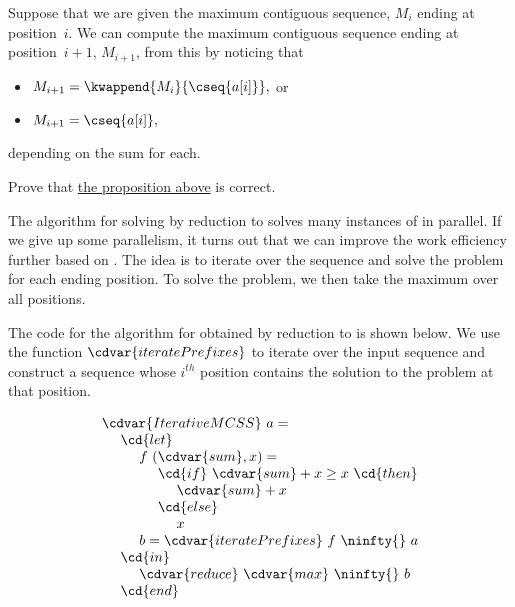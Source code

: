 \begin{proposition}
\label{prop:mcss::reduction::mcsse-overlaps}
Suppose that we are given the maximum contiguous sequence, $M_{i}$
ending at position~$i$.
%
We can compute the maximum contiguous sequence ending at position~$i+1$,
$M_{i+1}$, from this by noticing that 
%
\begin{itemize}
\item $M_{i+1} = \kwappend{M_{i}}{\cseq{a[i]}},$ or 
\item $M_{i+1} = \cseq{a[i]},$
\end{itemize}
%
depending on the sum for each.
\end{proposition}

\begin{exercise}
Prove that 
%
\href{prop:mcss::reduction::mcsse-overlaps}{the proposition above}
%
is correct.
\end{exercise}




\begin{gram}
The algorithm for solving \MCSS{} by reduction to \MCSSE{} solves many
instances of \MCSSE{} in parallel.
%
If we give up some parallelism, it turns out that we can improve the
work efficiency further based on
.
%
The idea is to iterate over the sequence and solve the \MCSSE{}
problem for each ending position.
%
To solve the \MCSSE{} problem, we then take the maximum over all
positions.
%
\end{gram}

\begin{algorithm}
\label{alg:mcs::iterative}
The \PML code for the algorithm for \MCSS{} obtained by reduction to
\MCSSE{} is shown below.
%
%
We use the function $\cdvar{iteratePrefixes}$ to iterate over the input
sequence and construct a sequence whose $i^{th}$ position contains the
solution to the \MCSSE{} problem at that position.

\[
\begin{array}{l}
\cdvar{IterativeMCSS}~a = 
\\
~~~~\cd{let}
\\ 
~~~~~~~~f~(\cdvar{sum},x) =
\\
~~~~~~~~~~~~\cd{if}~\cdvar{sum} + x \ge x~\cd{then}
\\ 
~~~~~~~~~~~~~~~~\cdvar{sum} + x
\\
~~~~~~~~~~~~\cd{else}
\\
~~~~~~~~~~~~~~~~x
\\ 
~~~~~~~~b = \cdvar{iteratePrefixes}~f~\ninfty{}~a
\\
~~~~\cd{in}
\\
~~~~~~~~\cdvar{reduce}~\cdvar{max}~\ninfty{}~b
\\
~~~~\cd{end}
\end{array}
\] 
\end{algorithm}

